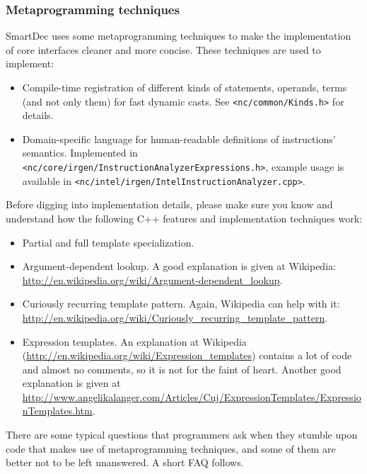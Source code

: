 \documentclass[a4paper,12pt]{article}
\begin{document}
\subsubsection{Metaprogramming techniques}

SmartDec uses some metaprogramming techniques to make the implementation of core interfaces cleaner and more concise.
These techniques are used to implement:
\begin{itemize}
\item Compile-time registration of different kinds of statements, operands, terms (and not only them) for fast dynamic casts. See \verb|<nc/common/Kinds.h>| for details.
\item Domain-specific language for human-readable definitions of instructions' semantics. Implemented in \verb|<nc/core/irgen/InstructionAnalyzerExpressions.h>|, example usage is available in \verb|<nc/intel/irgen/IntelInstructionAnalyzer.cpp>|.
\end{itemize}

Before digging into implementation details, please make sure you know and understand how the following C++ features and implementation techniques work:
\begin{itemize}
\item Partial and full template specialization. 
\item Argument-dependent lookup. A good explanation is given at Wikipedia: \url{http://en.wikipedia.org/wiki/Argument-dependent_lookup}.
\item Curiously recurring template pattern. Again, Wikipedia can help with it: \url{http://en.wikipedia.org/wiki/Curiously_recurring_template_pattern}.
\item Expression templates. An explanation at Wikipedia (\url{http://en.wikipedia.org/wiki/Expression_templates}) contains a lot of code and almost no comments, so it is not for the faint of heart. 
	Another good explanation is given at \url{http://www.angelikalanger.com/Articles/Cuj/ExpressionTemplates/ExpressionTemplates.htm}.
\end{itemize}

There are some typical questions that programmers ask when they stumble upon code that makes use of metaprogramming techniques, and some of them are better not to be left unanswered. A short FAQ follows.
\end{document}
